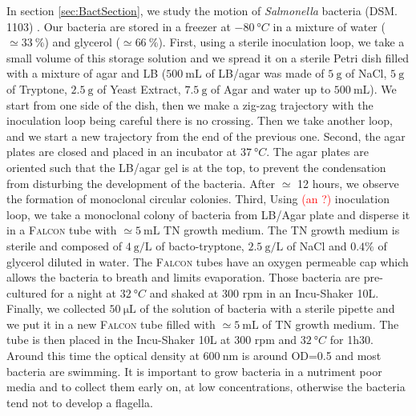 \documentclass[%
 aip,
 jmp,%
 amsmath,amssymb,
reprint,%
]{revtex4-1}
\begin{document}
In section \ref{sec:BactSection}, we study the motion of \textit{Salmonella} bacteria (DSM. 1103) \citep{21_fabrega2013salmonella}. Our bacteria are stored in a freezer at $\SI{-80}{\degree C}$ in a mixture of water ($\simeq \SI{33}{\%}$) and glycerol ($\simeq \SI{66}{\%}$). First, using a sterile inoculation loop, we take a small volume of this storage solution  and we spread it on a sterile Petri dish filled with a mixture of agar and LB ($\SI{500}{\milli\liter}$ of LB/agar was made of $\SI{5}{\gram}$ of NaCl, $\SI{5}{\gram}$ of Tryptone, $\SI{2.5}{\gram}$ of Yeast Extract, $\SI{7.5}{\gram}$ of Agar and water up to $\SI{500}{\milli\liter}$). We start from one side of the dish, then we make a zig-zag trajectory with the inoculation loop being careful there is no crossing. Then we take another loop, and we start a new trajectory from the end of the previous one. Second, the agar plates are closed and placed in an incubator at $\SI{37}{\degree C}$. The agar plates are oriented such that the LB/agar gel is at the top, to prevent the condensation from disturbing the development of the bacteria. After $\simeq$ 12 hours, we observe the formation of monoclonal circular colonies. Third, Using \textcolor{red}{(an ?)} inoculation loop, we take a monoclonal colony of bacteria from LB/Agar plate and disperse it in a \textsc{Falcon} tube with $\simeq \SI{5}{\milli\liter}$ TN growth medium. The TN growth medium is sterile and composed of $\SI{4}{\gram\per\liter}$ of bacto-tryptone, $\SI{2.5}{\gram\per\liter}$ of NaCl and $0.4\%$ of glycerol diluted in water. The \textsc{Falcon} tubes have an oxygen permeable cap which allows the bacteria to breath and limits evaporation. Those bacteria are pre-cultured for a night at $\SI{32}{\degree C}$ and shaked at 300 rpm in an Incu-Shaker 10L. Finally, we collected $\SI{50}{\micro\liter}$ of the solution of bacteria with a sterile pipette and we put it in a new \textsc{Falcon} tube filled with $\simeq \SI{5}{\milli\liter}$ of TN growth medium. The tube is then placed in the Incu-Shaker 10L at 300 rpm and $\SI{32}{\degree C}$ for 1h30. Around this time the optical density at $\SI{600}{\nano\meter}$ is around OD=0.5 and most bacteria are swimming. It is important to grow bacteria in a nutriment poor media and to collect them early on, at low concentrations, otherwise the bacteria tend not to develop a flagella.
\end{document}
